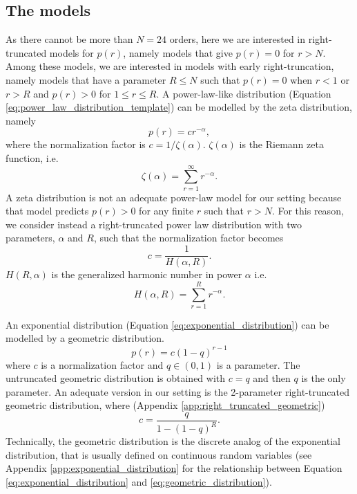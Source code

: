 \documentclass[USenglish]{article}
\begin{document}
\subsection{The models}

As there cannot be more than $N = 24$ orders, here we are interested in right-truncated models for $p(r)$, namely models that give $p(r) = 0$ for $r > N$.
Among these models, we are interested in models with early right-truncation, namely models that have a parameter $R \leq N$ such that $p(r) = 0$ when $r < 1$ or $r > R$ and $p(r) > 0$ for $1 \leq r \leq R$.
A power-law-like distribution (Equation \ref{eq:power_law_distribution_template}) can be modelled by the zeta distribution, namely 
\begin{equation}
p(r) = c r^{-\alpha},
\label{eq:power_law_distribution}
\end{equation}
where the normalization factor is $c = 1/\zeta(\alpha)$. $\zeta(\alpha)$ is the Riemann zeta function, i.e. 
\begin{equation}
\zeta(\alpha) = \sum_{r=1}^{\infty} r^{-\alpha}.
\end{equation}
A zeta distribution is not an adequate power-law model for our setting because that model predicts $p(r) > 0$ for any finite $r$ such that $r > N$. 
For this reason, we consider instead a right-truncated power law distribution with two parameters, $\alpha$ and $R$, such that the normalization factor becomes 
\begin{equation}
c = \frac{1}{H(\alpha,R)}.
\label{eq:normalization_factor_right_truncated_power_law}
\end{equation}
$H(R,\alpha)$ is the generalized harmonic number in power $\alpha$ %
i.e. 
\begin{equation*}
H(\alpha,R) = \sum_{r=1}^{R} r^{-\alpha}.
\end{equation*} 

An exponential distribution (Equation \ref{eq:exponential_distribution}) can be modelled by a geometric distribution. 
\begin{equation}
p(r) = c(1-q)^{r - 1}
\label{eq:geometric_distribution}
\end{equation}
where $c$ is a normalization factor and $q \in (0, 1)$ is a parameter. 
The untruncated geometric distribution is obtained with $c=q$ and then $q$ is the only parameter. An adequate version in our setting is the 2-parameter right-truncated geometric distribution, where (Appendix \ref{app:right_truncated_geometric})
\begin{equation}
c = \frac{q}{1 - (1 - q)^R}.
\label{eq:normalization_factor_right_truncated_geometric}
\end{equation}
Technically, the geometric distribution is the discrete analog of the exponential distribution, that is usually defined on continuous random variables (see Appendix \ref{app:exponential_distribution} for the relationship between Equation \ref{eq:exponential_distribution} and \ref{eq:geometric_distribution}). 
\end{document}
